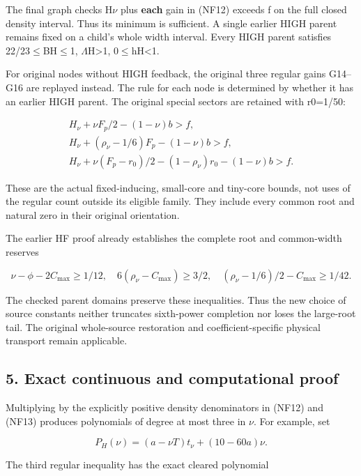 The final graph checks H\ensuremath{\nu} plus \textbf{each} gain in (NF12) exceeds f on the full closed density interval. Thus its minimum is sufficient. A single earlier HIGH parent remains fixed on a child's whole width interval. Every HIGH parent satisfies 22/23\ensuremath{\le}BH\ensuremath{\le}1, \ensuremath{\Lambda}H\textgreater1, 0\ensuremath{\le}hH\textless1.

For original nodes without HIGH feedback, the original three regular gains G14--G16 are replayed instead. The rule for each node is determined by whether it has an earlier HIGH parent. The original special sectors are retained with r0=1/50:

\[
\begin{gathered}
H_\nu+\nu F_p/2-(1-\nu)b>f,\\
H_\nu+(\rho_\nu-1/6)F_p-(1-\nu)b>f,\\
H_\nu+\nu(F_p-r_0)/2-(1-\rho_\nu)r_0-(1-\nu)b>f.
\end{gathered}
\tag{NF13}
\]

These are the actual fixed-inducing, small-core and tiny-core bounds, not uses of the regular count outside its eligible family. They include every common root and natural zero in their original orientation.

The earlier HF proof already establishes the complete root and common-width reserves

\[
\nu-\phi-2C_{\max}\ge1/12,\quad
6(\rho_\nu-C_{\max})\ge3/2,\quad
(\rho_\nu-1/6)/2-C_{\max}\ge1/42.
\tag{NF14}
\]

The checked parent domains preserve these inequalities. Thus the new choice of source constants neither truncates sixth-power completion nor loses the large-root tail. The original whole-source restoration and coefficient-specific physical transport remain applicable.

\hypertarget{feedback:exact-continuous-and-computational-proof}{%
\subsection{5. Exact continuous and computational proof}\label{feedback:exact-continuous-and-computational-proof}}

Multiplying by the explicitly positive density denominators in (NF12) and (NF13) produces polynomials of degree at most three in \ensuremath{\nu}. For example, set

\[
P_H(\nu)=(a-\nu T)t_\nu+(10-60a)\nu.
\]

The third regular inequality has the exact cleared polynomial

